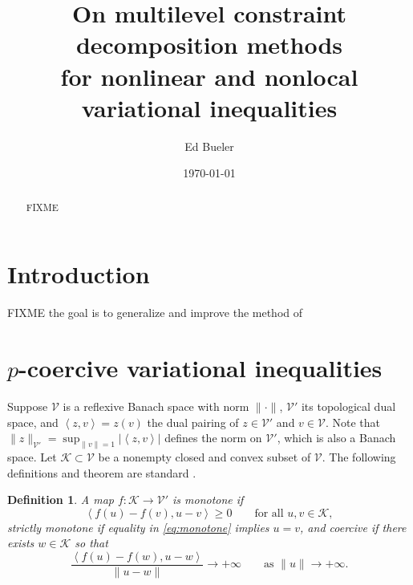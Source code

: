 \documentclass[letterpaper,final,12pt,reqno]{amsart}
\theoremstyle{cstyle}
\theoremstyle{dstyle}
\newtheorem{definition}[theorem]{Definition}
\numberwithin{equation}{section}
\numberwithin{figure}{section}
\numberwithin{table}{section}
\numberwithin{theorem}{section}
\newcommand{\cK}{\mathcal{K}}
\newcommand{\cV}{\mathcal{V}}
\newcommand{\ip}[2]{\left<#1,#2\right>}
\begin{document}
\title[On MCD methods for nonlinear and nonlocal VIs]{On multilevel constraint decomposition methods \\ for nonlinear and nonlocal variational inequalities}

\author{Ed Bueler}

\date{\today}

\begin{abstract} FIXME
\end{abstract}

\maketitle


\thispagestyle{empty}

\section{Introduction} \label{sec:intro}

FIXME the goal is to generalize and improve the method of \cite{Tai2003}

\section{$p$-coercive variational inequalities} \label{sec:vi}

Suppose $\cV$ is a reflexive Banach space with norm $\|\cdot\|$, $\cV'$ its topological dual space, and $\ip{z}{v} = z(v)$ the dual pairing of $z \in \cV'$ and $v\in \cV$.  Note that $\|z\|_{\cV'} = \sup_{\|v\|=1} |\ip{z}{v}|$ defines the norm on $\cV'$, which is also a Banach space.  Let $\cK \subset \cV$ be a nonempty closed and convex subset of $\cV$.  The following definitions and theorem are standard \cite{KinderlehrerStampacchia1980}.

\begin{definition}  A map $f:\cK \to \cV'$ is \emph{monotone} if
\begin{equation}
\ip{f(u)-f(v)}{u-v} \ge 0 \qquad \text{for all } u,v \in \cK, \label{eq:monotone}
\end{equation}
\emph{strictly monotone} if equality in \eqref{eq:monotone} implies $u=v$, and \emph{coercive} if there exists $w \in \cK$ so that
\begin{equation}
\frac{\ip{f(u)-f(w)}{u-w}}{\|u-w\|} \to +\infty \qquad \text{as } \|u\|\to +\infty.
\end{equation}
\end{definition}
\end{document}
